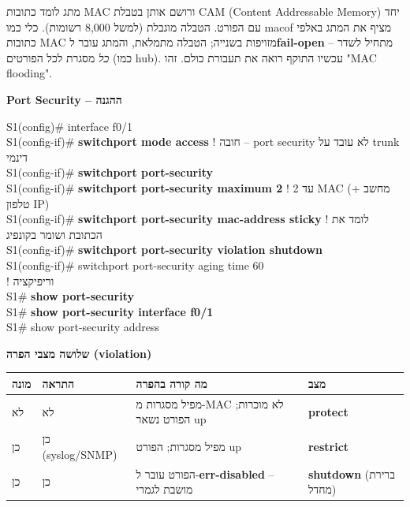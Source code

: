 \documentclass[11pt]{article}
\newcommand{\enLR}[1]{\textenglish{#1}}
\newcommand{\code}[1]{\textenglish{\codefont #1}}
\newcommand{\subheading}[1]{\vskip6pt{\bfseries\color{h3}#1\par}\vskip2pt}
\begin{document}
מתג לומד כתובות \enLR{MAC} ורושם אותן בטבלת \enLR{CAM (Content Addressable Memory)} יחד עם הפורט. הטבלה מוגבלת (למשל \enLR{8,000} רשומות). כלי כמו \code{macof} מציף את המתג באלפי כתובות \enLR{MAC} מזויפות בשנייה; הטבלה מתמלאת, והמתג עובר ל\textbf{\enLR{fail-open}} – מתחיל לשדר \emph{כל} מסגרת לכל הפורטים (כמו \enLR{hub).} עכשיו התוקף רואה את תעבורת כולם. זהו "\enLR{MAC flooding".}\par

\subheading{\enLR{Port Security} – ההגנה}

\begin{codebox}\begin{english}\codefont\footnotesize\color{cfg}\setlength{\parindent}{0pt}
S1(config)\# interface f0/1\\
S1(config-if)\# \textcolor{cbold}{\textbf{switchport mode access}}              \textcolor{ccom}{\texthebrew{! חובה – \enLR{port security} לא עובד על \enLR{trunk} דינמי}}\\
S1(config-if)\# \textcolor{cbold}{\textbf{switchport port-security}}\\
S1(config-if)\# \textcolor{cbold}{\textbf{switchport port-security maximum 2}}    \textcolor{ccom}{\texthebrew{! עד \enLR{2 MAC} (מחשב + טלפון \enLR{IP)}}}\\
S1(config-if)\# \textcolor{cbold}{\textbf{switchport port-security mac-address sticky}}  \textcolor{ccom}{\texthebrew{! לומד את הכתובת ושומר בקונפיג}}\\
S1(config-if)\# \textcolor{cbold}{\textbf{switchport port-security violation shutdown}}\\
S1(config-if)\# switchport port-security aging time 60\\
\textcolor{ccom}{\texthebrew{! וריפיקציה}}\\
S1\# \textcolor{cbold}{\textbf{show port-security}}\\
S1\# \textcolor{cbold}{\textbf{show port-security interface f0/1}}\\
S1\# show port-security address
\end{english}\end{codebox}

\subheading{שלושה מצבי הפרה \enLR{(violation)}}

\begin{xltabular}{\linewidth}{|>{\setRTL\raggedleft\arraybackslash}X|>{\setRTL\raggedleft\arraybackslash}X|>{\setRTL\raggedleft\arraybackslash}X|>{\setRTL\raggedleft\arraybackslash}X|}
\hline
{}\textbf{מונה} & \textbf{התראה} & \textbf{מה קורה בהפרה} & \textbf{מצב} \\
\hline
\endhead
לא & לא & מפיל מסגרות מ-\enLR{MAC} לא מוכרות; הפורט נשאר \enLR{up} & \textbf{\enLR{protect}} \\
\hline
כן & כן \enLR{(syslog/SNMP)} & מפיל מסגרות; הפורט \enLR{up} & \textbf{\enLR{restrict}} \\
\hline
כן & כן & הפורט עובר ל-\textbf{\enLR{err-disabled}} – מושבת לגמרי & \textbf{\enLR{shutdown}} (ברירת מחדל) \\
\hline
\end{xltabular}
\end{document}
